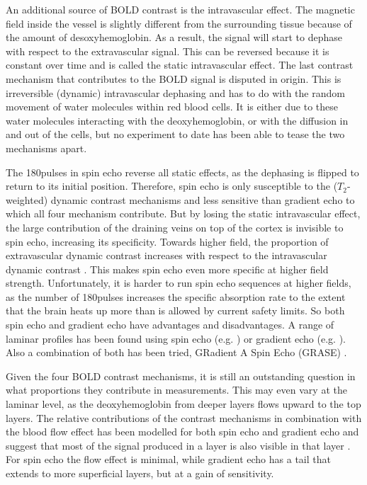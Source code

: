 An additional source of BOLD contrast is the intravascular effect. The magnetic field inside the vessel is slightly different from the surrounding tissue because of the amount of desoxyhemoglobin. As a result, the signal will start to dephase with respect to the extravascular signal. This can be reversed because it is constant over time and is called the static intravascular effect. The last contrast mechanism that contributes to the BOLD signal is disputed in origin. This is irreversible (dynamic) intravascular dephasing and has to do with the random movement of water molecules within red blood cells. It is either due to these water molecules interacting with the deoxyhemoglobin, or with the diffusion in and out of the cells, but no experiment to date has been able to tease the two mechanisms apart.

The 180\textdegree pulses in spin echo reverse all static effects, as the dephasing is flipped to return to its initial position. Therefore, spin echo is only susceptible to the ($T_2$-weighted) dynamic contrast mechanisms and less sensitive than gradient echo to which all four mechanism contribute. But by losing the static intravascular effect, the large contribution of the draining veins on top of the cortex is invisible to spin echo, increasing its specificity. Towards higher field, the proportion of extravascular dynamic contrast increases with respect to the intravascular dynamic contrast \cite{Norris2002,Jochimsen2004,Norris2006}. This makes spin echo even more specific at higher field strength. Unfortunately, it is harder to run spin echo sequences at higher fields, as the number of 180\textdegree pulses increases the specific absorption rate to the extent that the brain heats up more than is allowed by current safety limits. So both spin echo and gradient echo have advantages and disadvantages. A range of laminar profiles has been found using spin echo (e.g. \cite{Zhao2004,Harel2006,Goense2006}) or gradient echo (e.g. \cite{Polimeni2010,DeMartino2013,Chen2013}). Also a combination of both has been tried, GRadient A Spin Echo (GRASE) \cite{Olman2012,DeMartino2013}.

Given the four BOLD contrast mechanisms, it is still an outstanding question in what proportions they contribute in measurements. This may even vary at the laminar level, as the deoxyhemoglobin from deeper layers flows upward to the top layers. The relative contributions of the contrast mechanisms in combination with the blood flow effect has been modelled for both spin echo and gradient echo and suggest that most of the signal produced in a layer is also visible in that layer \cite{Markuerkiaga2016,Uludag2017}. For spin echo the flow effect is minimal, while gradient echo has a tail that extends to more superficial layers, but at a gain of sensitivity. 

